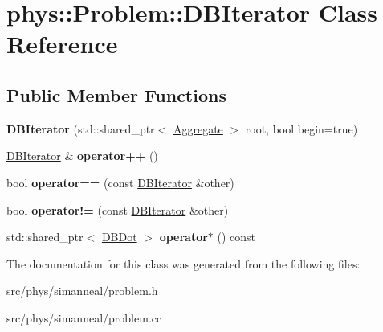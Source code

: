 \hypertarget{classphys_1_1Problem_1_1DBIterator}{}\section{phys\+:\+:Problem\+:\+:D\+B\+Iterator Class Reference}
\label{classphys_1_1Problem_1_1DBIterator}
\subsection*{Public Member Functions}
\begin{DoxyCompactItemize}
\item 
{\bfseries D\+B\+Iterator} (std\+::shared\+\_\+ptr$<$ \hyperlink{classphys_1_1Problem_1_1Aggregate}{Aggregate} $>$ root, bool begin=true)\hypertarget{classphys_1_1Problem_1_1DBIterator_a9383055e2d2098a1bb59af5ddda84b05}{}\label{classphys_1_1Problem_1_1DBIterator_a9383055e2d2098a1bb59af5ddda84b05}

\item 
\hyperlink{classphys_1_1Problem_1_1DBIterator}{D\+B\+Iterator} \& {\bfseries operator++} ()\hypertarget{classphys_1_1Problem_1_1DBIterator_a54de45789b41a10422fc0c2b15d4bd0d}{}\label{classphys_1_1Problem_1_1DBIterator_a54de45789b41a10422fc0c2b15d4bd0d}

\item 
bool {\bfseries operator==} (const \hyperlink{classphys_1_1Problem_1_1DBIterator}{D\+B\+Iterator} \&other)\hypertarget{classphys_1_1Problem_1_1DBIterator_a511c55df1d5813d16bde8f81126825ab}{}\label{classphys_1_1Problem_1_1DBIterator_a511c55df1d5813d16bde8f81126825ab}

\item 
bool {\bfseries operator!=} (const \hyperlink{classphys_1_1Problem_1_1DBIterator}{D\+B\+Iterator} \&other)\hypertarget{classphys_1_1Problem_1_1DBIterator_a96f37071cc1b09753cfb410b47f2161d}{}\label{classphys_1_1Problem_1_1DBIterator_a96f37071cc1b09753cfb410b47f2161d}

\item 
std\+::shared\+\_\+ptr$<$ \hyperlink{structphys_1_1Problem_1_1DBDot}{D\+B\+Dot} $>$ {\bfseries operator$\ast$} () const \hypertarget{classphys_1_1Problem_1_1DBIterator_a8231d731d28679a44dc43f88ca9d5f6a}{}\label{classphys_1_1Problem_1_1DBIterator_a8231d731d28679a44dc43f88ca9d5f6a}

\end{DoxyCompactItemize}


The documentation for this class was generated from the following files\+:\begin{DoxyCompactItemize}
\item 
src/phys/simanneal/problem.\+h\item 
src/phys/simanneal/problem.\+cc\end{DoxyCompactItemize}
